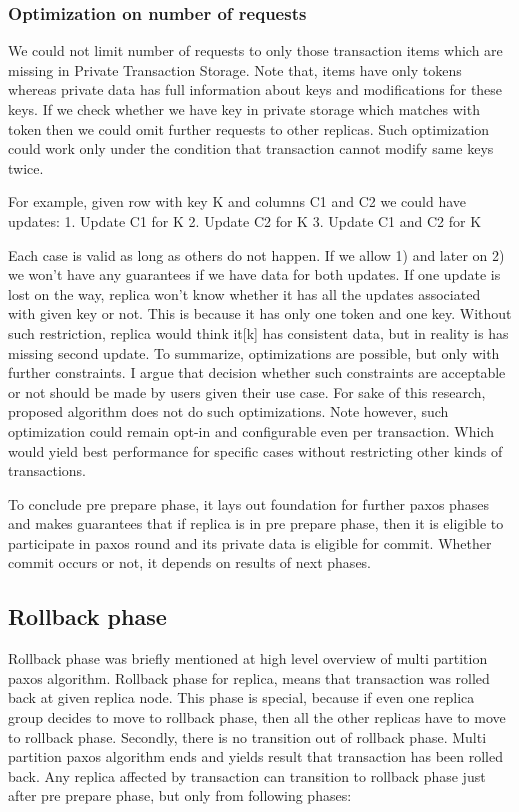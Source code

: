\subsubsection{Optimization on number of requests}
We could not limit number of requests to only those transaction items which are missing in Private Transaction Storage. Note that, items have only tokens whereas private data has full information about keys and modifications for these keys. If we check whether we have key in private storage which matches with token then we could omit further requests to other replicas. 
Such optimization could work only under the condition that transaction cannot modify same keys twice. 


For example, given row with key K and columns C1 and C2 we could have updates:
1. Update C1 for K
2. Update C2 for K
3. Update C1 and C2 for K


Each case is valid as long as others do not happen. If we allow 1) and later on 2) we won’t have any guarantees if we have data for both updates. If one update is lost on the way, replica won’t know whether it has all the updates associated with given key or not. This is because it has only one token and one key. 
Without such restriction, replica would think it[k] has consistent data, but in reality is has missing second update.
To summarize, optimizations are possible, but only with further constraints. I argue that decision whether such constraints are acceptable or not should be made by users given their use case. For sake of this research, proposed algorithm does not do such optimizations. Note however, such optimization could remain opt-in and configurable even per transaction. Which would yield best performance for specific cases without restricting other kinds of transactions.
        
To conclude pre prepare phase, it lays out foundation for further paxos phases and makes guarantees that if replica is in pre prepare phase, then it is eligible to participate in paxos round and its private data is eligible for commit. Whether commit occurs or not, it depends on results of next phases.


\subsection{Rollback phase}
Rollback phase was briefly mentioned at high level overview of multi partition paxos algorithm. 
Rollback phase for replica, means that transaction was rolled back at given replica node. 
This phase is special, because if even one replica group decides to move to rollback phase, then all the other replicas have to move to rollback phase. Secondly, there is no transition out of rollback phase. Multi partition paxos algorithm ends and yields result that transaction has been rolled back.
Any replica affected by transaction can transition to rollback phase just after pre prepare phase, but only from following phases:


